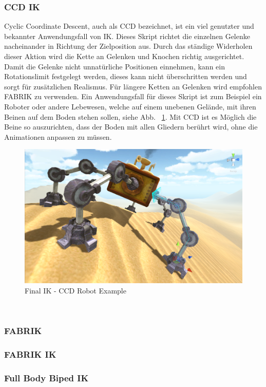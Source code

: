 \subsubsection{CCD IK}
Cyclic Coordinate Descent, auch als CCD bezeichnet, ist ein viel genutzter und bekannter Anwendungsfall von IK.
Dieses Skript richtet die einzelnen Gelenke nacheinander in Richtung der Zielposition aus.
Durch das ständige Widerholen dieser Aktion wird die Kette an Gelenken und Knochen richtig ausgerichtet.
Damit die Gelenke nicht unnatürliche Positionen einnehmen, kann ein Rotationslimit festgelegt werden, dieses kann nicht überschritten werden und sorgt für zusätzlichen Realismus.
Für längere Ketten an Gelenken wird empfohlen FABRIK zu verwenden.
Ein Anwendungsfall für dieses Skript ist zum Beispiel ein Roboter oder andere Lebewesen, welche auf einem unebenen Gelände, mit ihren Beinen auf dem Boden stehen sollen, siehe Abb. ~\ref{fig:finalIK_ccd_robot_example}.
Mit CCD ist es Möglich die Beine so auszurichten, dass der Boden mit allen Gliedern berührt wird, ohne die Animationen anpassen zu müssen.
\begin {figure}
    \centering
    \includegraphics[scale=0.4]{pics/finalik_ccd}
    \caption{Final IK - CCD Robot Example}
    \label{fig:finalIK_ccd_robot_example}
\end {figure}
~\cite{FinalIK_CCD_2021}

\subsubsection{FABRIK}
\subsubsection{FABRIK IK}
\subsubsection{Full Body Biped IK}
